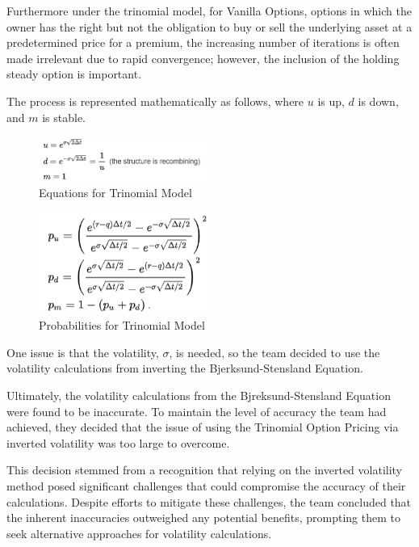 \documentclass[11pt]{article}
\begin{document}
Furthermore under the trinomial model, for Vanilla Options, options in which the owner has the right but not the obligation to buy or sell the underlying asset at a predetermined price for a premium, the increasing number of iterations is often made irrelevant due to rapid convergence; however, the inclusion of the holding steady option is important. 

The process is represented mathematically as follows, where $u$ is up, $d$ is down, and $m$ is stable.
\begin{figure}[H]
    \centering
    \includegraphics[width=0.5\textwidth]{eq1.png} 
    \caption{Equations for Trinomial Model}
    \label{fig:example}
\end{figure}

\begin{figure}[H]
    \centering
    \includegraphics[width=0.5\textwidth]{eq2.png} 
    \caption{Probabilities for Trinomial Model}
    \label{fig:example}
\end{figure}
One issue is that the volatility, $\sigma$, is needed, so the team decided to use the volatility calculations from inverting the Bjerksund-Stensland Equation.

Ultimately, the volatility calculations from the Bjreksund-Stensland Equation were found to be inaccurate. To maintain the level of accuracy the team had achieved, they decided that the issue of using the Trinomial Option Pricing via inverted volatility was too large to overcome. 

This decision stemmed from a recognition that relying on the inverted volatility method posed significant challenges that could compromise the accuracy of their calculations. Despite efforts to mitigate these challenges, the team concluded that the inherent inaccuracies outweighed any potential benefits, prompting them to seek alternative approaches for volatility calculations.
\end{document}
